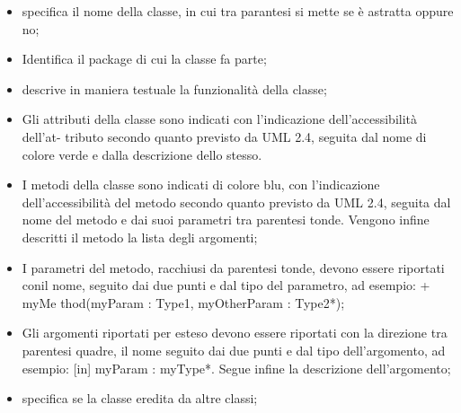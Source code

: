\begin{itemize}
\item {}specifica il nome della classe, in cui tra parantesi si mette se è astratta oppure no;
\item {} Identifica il package di cui la classe fa parte;
\item {}descrive in maniera testuale la funzionalità della classe;
\item {}Gli attributi della classe sono indicati con l’indicazione dell’accessibilità dell’at-
tributo secondo quanto previsto da UML 2.4, seguita dal nome di colore verde e
dalla descrizione dello stesso.
\item {}I metodi della classe sono indicati di colore blu, con l’indicazione dell’accessibilità
del metodo secondo quanto previsto da UML 2.4, seguita dal nome del metodo e
dai suoi parametri tra parentesi tonde.
Vengono infine descritti il metodo  la lista degli argomenti;
\item {} I parametri del metodo, racchiusi da parentesi tonde, devono essere riportati conil nome, seguito dai due punti e dal tipo del parametro, ad esempio: + myMe
thod(myParam : Type1, myOtherParam : Type2*);
\item {}Gli argomenti riportati per esteso devono essere riportati con la direzione tra
parentesi quadre, il nome seguito dai due punti e dal tipo dell’argomento, ad
esempio: [in] myParam : myType*. Segue infine la descrizione dell’argomento;

\item {}specifica se la classe eredita da altre classi;
\end{itemize}


